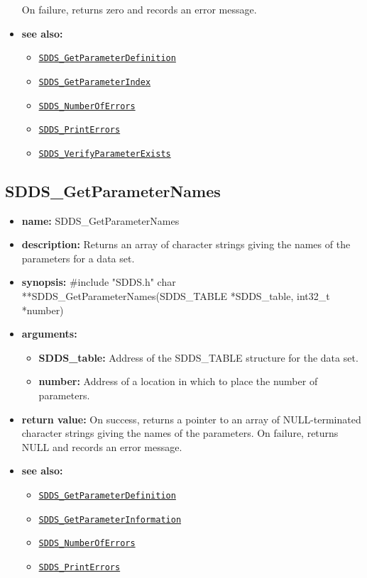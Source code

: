 \documentclass[11pt]{article}
\newcommand{\progref}[1]{\hyperref[SDDS_#1]{\tt SDDS\_#1}}
\begin{document}
\begin{itemize}
\newline
On failure, returns zero and records an error message. 
\item {\bf see also:}
\begin{itemize}
\item \progref{GetParameterDefinition}
\item \progref{GetParameterIndex}
\item \progref{NumberOfErrors}
\item \progref{PrintErrors}
\item \progref{VerifyParameterExists}
\end{itemize}
\end{itemize}

\subsection{SDDS\_GetParameterNames}
\label{SDDS_GetParameterNames}

\begin{itemize}
\item {\bf name:}\newline
SDDS\_GetParameterNames
\item {\bf description:}\newline
Returns an array of character strings giving the names of the parameters for a data set.
\item {\bf synopsis:} \#include "SDDS.h"\newline
char **SDDS\_GetParameterNames(SDDS\_TABLE *SDDS\_table, int32\_t *number)
\item {\bf arguments:}
\begin{itemize}
\item {\bf SDDS\_table:} Address of the SDDS\_TABLE structure for the data set.
\item {\bf number:} Address of a location in which to place the number of parameters.
\end{itemize}
\item {\bf return value:}\newline
On success, returns a pointer to an array of NULL-terminated character strings giving the names of the parameters. On failure, returns NULL and records an error message.
\item {\bf see also:}
\begin{itemize}
\item \progref{GetParameterDefinition}
\item \progref{GetParameterInformation}
\item \progref{NumberOfErrors}
\item \progref{PrintErrors}
\end{itemize}
\end{itemize}
\end{document}
